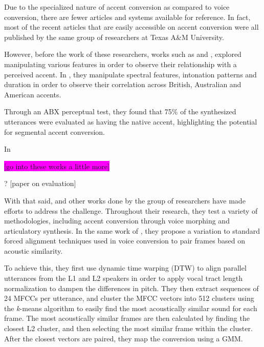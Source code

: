 \documentclass
[
    a4paper,
    twoside,
    12pt,
]
{report}
\begin{document}
Due to the specialized nature of accent conversion as compared to voice
conversion, there are fewer articles and systems available for
reference. In fact, most of the recent articles that are easily
accessible on accent conversion were all published by the same group of
researchers at Texas A\&M University.

However, before the work of these researchers, works such as
\textcite{yan2004} and \textcite{huckvale2007}, explored manipulating
various features in order to observe their relationship with a perceived
accent. In \textcite{yan2004}, they manipulate spectral features,
intonation patterns and duration in order to observe their correlation
across British, Australian and American accents.

Through an ABX perceptual test, they found that 75\% of the synthesized
utterances were evaluated as having the native accent, highlighting the
potential for segmental accent conversion.

In \textcite{huckvale2007}

\colorbox{magenta}{[go into these works a little more]}

\colorbox{magenta}{\textcite{felps2009}}

\colorbox{magenta}{\textcite{felps2010}} ? {[}paper on evaluation{]}

\colorbox{magenta}{\textcite{aryal2010}}

\colorbox{magenta}{\textcite{felps2012}}

With that said, \textcite{aryal2014} and other works done by the group
of researchers have made efforts to address the challenge. Throughout
their research, they test a variety of methodologies, including accent
conversion through voice morphing and articulatory synthesis. In the
same work of \textcite{aryal2014}, they propose a variation to standard
forced alignment techniques used in voice conversion to pair frames
based on acoustic similarity.

To achieve this, they first use dynamic time warping (DTW) to align
parallel utterances from the L1 and L2 speakers in order to apply vocal
tract length normalization to dampen the differences in pitch. They then
extract sequences of 24 MFCCs per utterance, and cluster the MFCC
vectors into 512 clusters using the \textit{k}-means algorithm to easily
find the most acoustically similar sound for each frame. The most
acoustically similar frames are then calculated by finding the closest
L2 cluster, and then selecting the most similar frame within the
cluster. After the closest vectors are paired, they map the conversion
using a GMM.
\end{document}
